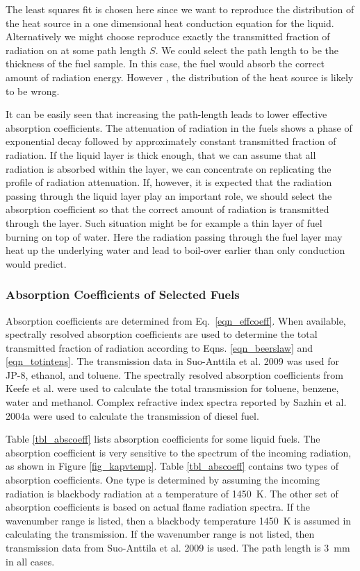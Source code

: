 The least squares fit is chosen here since we want to reproduce the distribution of the heat source in a one dimensional heat conduction equation for the liquid. Alternatively we might choose reproduce exactly the transmitted fraction of radiation on at some path length $S$. We could select the path length to be the thickness of the fuel sample. In this case, the fuel would absorb the correct amount of radiation energy. However , the distribution of the heat source is likely to be wrong.

It can be easily seen that increasing the path-length leads to lower effective absorption coefficients.  The attenuation of radiation in the fuels shows a phase of exponential decay followed by approximately constant transmitted fraction of radiation. If the liquid layer is thick enough, that we can assume that all radiation is absorbed within the layer, we can concentrate on replicating the profile of radiation attenuation. If, however, it is expected that the radiation passing through the liquid layer play an important role, we should select the absorption coefficient so that the correct amount of radiation is transmitted through the layer. Such situation might be for example a thin layer of fuel burning on top of water. Here the radiation passing through the fuel layer may heat up the underlying water and lead to boil-over earlier than only conduction would predict.

\subsubsection{Absorption Coefficients of Selected Fuels}

Absorption coefficients are determined from Eq.~\ref{eqn_effcoeff}. When available, spectrally resolved absorption coefficients are used to determine the total transmitted fraction of radiation according to Eqns. \ref{eqn_beerslaw} and \ref{eqn_totintens}.  The transmission data in Suo-Anttila et al. 2009 \cite{Suo-Anttila:PCT2009} was used for JP-8, ethanol, and toluene. The spectrally resolved absorption coefficients from Keefe et al. were used to calculate the total transmission for toluene, benzene, water and methanol. Complex refractive index spectra reported by Sazhin et al. 2004a \cite{Sazhin:JHT2004a} were used to calculate the transmission of diesel fuel.

Table \ref{tbl_abscoeff} lists absorption coefficients for some liquid fuels. The absorption coefficient is very sensitive to the spectrum of the incoming radiation, as shown in Figure \ref{fig_kapvtemp}. Table \ref{tbl_abscoeff} contains two types of absorption coefficients. One type is determined by assuming the incoming radiation is blackbody radiation at a temperature of 1450~K. The other set of absorption coefficients is based on actual flame radiation spectra. If the wavenumber range is listed, then a blackbody temperature 1450~K is assumed in calculating the transmission. If the wavenumber range is not listed, then transmission data from Suo-Anttila et al. 2009 \cite{Suo-Anttila:PCT2009} is used. The path length is 3~mm in all cases.

